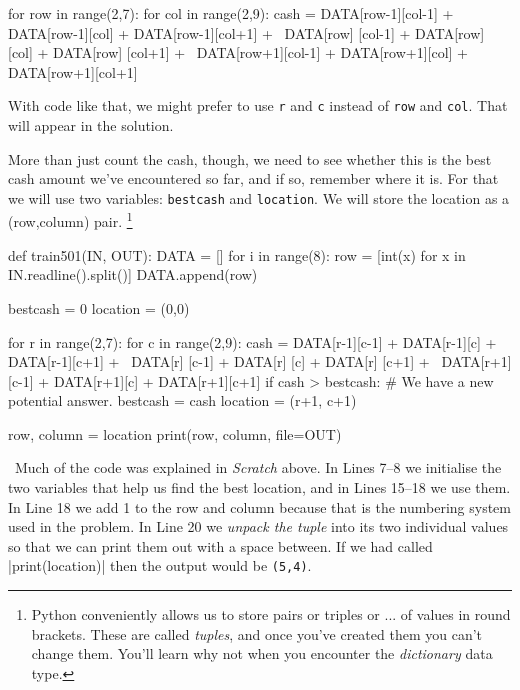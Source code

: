 \begin{pythoncode}
  for row in range(2,7):
    for col in range(2,9):
      cash = DATA[row-1][col-1] + DATA[row-1][col] + DATA[row-1][col+1] + \
             DATA[row]  [col-1] + DATA[row]  [col] + DATA[row]  [col+1] + \
             DATA[row+1][col-1] + DATA[row+1][col] + DATA[row+1][col+1]
\end{pythoncode}

With code like that, we might prefer to use \texttt{r} and \texttt{c} instead of
\texttt{row} and \texttt{col}. That will appear in the solution.

More than just count the cash, though, we need to see whether this is the best cash amount
we've encountered so far, and if so, remember where it is. For that we will use two
variables: \texttt{bestcash} and \texttt{location}. We will store the location as a
(row,column) pair.%
\footnote{Python conveniently allows us to store pairs or triples or ... of values in
round brackets. These are called \emph{tuples}, and once you've created them you can't
change them. You'll learn why not when you encounter the \emph{dictionary} data type.}

\Solution

\begin{pythoncode}
  def train501(IN, OUT):
    DATA = []
    for i in range(8):
      row = [int(x) for x in IN.readline().split()]
      DATA.append(row)
    
    bestcash = 0
    location = (0,0)

    for r in range(2,7):
      for c in range(2,9):
        cash = DATA[r-1][c-1] + DATA[r-1][c] + DATA[r-1][c+1] + \
               DATA[r]  [c-1] + DATA[r]  [c] + DATA[r]  [c+1] + \
               DATA[r+1][c-1] + DATA[r+1][c] + DATA[r+1][c+1]
        if cash > bestcash:
          # We have a new potential answer.
          bestcash = cash
          location = (r+1, c+1)

    row, column = location
    print(row, column, file=OUT)
\end{pythoncode}

\Explanation\ Much of the code was explained in \emph{Scratch} above. In Lines 7--8 we
initialise the two variables that help us find the best location, and in Lines 15--18 we
use them. In Line 18 we add 1 to the row and column because that is the numbering system
used in the problem. In Line 20 we \emph{unpack the tuple} into its two individual values
so that we can print them out with a space between. If we had called
\pycode|print(location)| then the output would be \texttt{(5,4)}.


